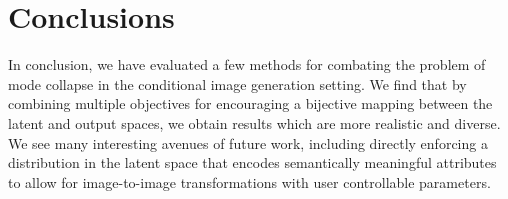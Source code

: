 \section{Conclusions}
\label{sec:conclusion}
\vspace{-2mm}

In conclusion, we have evaluated a few methods for combating the problem of mode collapse in the conditional image generation setting. We find that by combining multiple objectives for encouraging a bijective mapping between the latent and output spaces, we obtain results which are more realistic and diverse. We see many interesting avenues of future work, including directly enforcing a distribution in the latent space that encodes semantically meaningful attributes to allow for image-to-image transformations with user controllable parameters.

